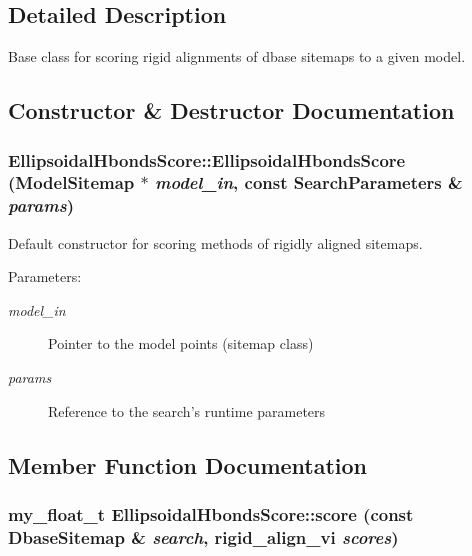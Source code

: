 \subsection{Detailed Description}
Base class for scoring rigid alignments of dbase sitemaps to a given model. 



\subsection{Constructor \& Destructor Documentation}
\subsubsection{\setlength{\rightskip}{0pt plus 5cm}Ellipsoidal\-Hbonds\-Score::Ellipsoidal\-Hbonds\-Score (\bf{Model\-Sitemap} $\ast$ {\em model\_\-in}, const \bf{Search\-Parameters} \& {\em params})}\label{classSimSite3D_1_1EllipsoidalHbondsScore_bc22221f61f9d49046c70d382c09100a}


Default constructor for scoring methods of rigidly aligned sitemaps. 

\begin{Desc}
\item[Parameters:]
\begin{description}
\item[{\em model\_\-in}]Pointer to the model points (sitemap class) \item[{\em params}]Reference to the search's runtime parameters \end{description}
\end{Desc}


\subsection{Member Function Documentation}
\subsubsection{\setlength{\rightskip}{0pt plus 5cm}my\_\-float\_\-t Ellipsoidal\-Hbonds\-Score::score (const \bf{Dbase\-Sitemap} \& {\em search}, rigid\_\-align\_\-vi {\em scores})\hspace{0.3cm}{\tt  [protected]}}\label{classSimSite3D_1_1EllipsoidalHbondsScore_d2d7d3b19e1996210beea00d80ca7ec8}


